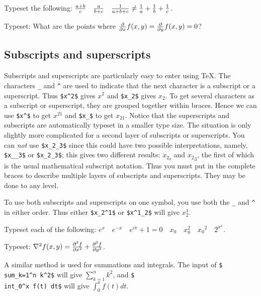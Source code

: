 \exercise Typeset the following: ${a+b\over c}\quad {a\over b+c} 
\quad {1\over a+b+c} \not= {1\over a}+{1\over b}+{1\over c}$. 
 
\exercise Typeset: What are the points where 
${\partial \over \partial x} f(x,y) = {\partial \over \partial y} 
f(x,y) = 0$? 
 
\subsection{Subscripts and superscripts} 
 
Subscripts and superscripts are particularly easy to enter using 
\TeX\null. The characters {\tt \_{}} and {\tt \^{}} are used to 
indicate that the next character is a subscript or a superscript. 
Thus {\tt \$x\^{}2\$} gives $x^2$ and {\tt \$x\_{}2\$} gives 
$x_2$\null.  To get several characters as a subscript or 
superscript, they are grouped together within braces. Hence we 
can use {\tt \$x\^{}\rb\$} to get $x^{21}$ and {\tt \$x\_{}\rb\$} to get $x_{21}$\null. Notice that the 
superscripts and subscripts are automatically typeset in a 
smaller type size. The situation is only slightly more 
complicated for a second layer of subscripts or superscripts. 
You can {\sl not\/} use {\tt \$x\_{}2\_{}3\$} since this could 
have two possible interpretations, namely, {\tt \$x\_{}\_{}3\rb\$} 
or {\tt \$\lb x\_{}2\rb\_{}3\$}; this gives two 
different results: $x_{2_3}$ and ${x_2}_3$, the first of which is 
the usual mathematical subscript notation.  Thus you must put in 
the complete braces to describe multiple layers of subscripts and 
superscripts.  They may be done to any level. 
 
To use both subscripts and superscripts on one symbol, you use 
both the {\tt \_{}} and {\tt \^{}} in either order.  Thus either 
{\tt \$x\_{}2\^{}1\$} or {\tt\$x\^{}1\_{}2\$} will give $x_2^1$. 
 
\exercise 
Typeset each of the following: $e^x \quad e^{-x} \quad 
e^{i\pi}+1=0 \quad x_0 \quad x_0^2 \quad {x_0}^2 \quad 2^{x^x}$. 
 
\exercise Typeset: 
$\nabla^2 f(x,y) = {\partial^2 f \over\partial x^2} 
+ {\partial^2 f \over\partial y^2}$. 
\bigskip 
 
A similar method is used for summations and integrals.  The input 
of {\tt \$\\sum\_{}\lb k=1\rb\^{}n k\^{}2\$} will give $\sum_{k=1}^n 
k^2$, and {\tt \$\\int\_{}0\^{}x f(t) dt\$} will 
give $\int_0^x f(t) dt$. 
 
